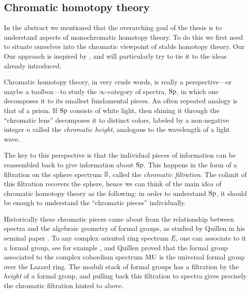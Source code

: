 

\subsection{Chromatic homotopy theory}
\label{ch0:ssec:chromatic-homotopy-theory}

In the abstract we mentioned that the overarching goal of the thesis is to understand aspects of monochromatic homotopy theory. To do this we first need to situate ourselves into the chromatic viewpoint of stable homotopy theory. Our Our approach is inspired by \cite{barthel-beaudry_19}, and will particularly try to tie it to the ideas already introduced. 

Chromatic homotopy theory, in very crude words, is really a perspective---or maybe a toolbox---to study the $\infty$-category of spectra, $\Sp$, in which one decomposes it to its smallest fundamental pieces. An often repeated analogy is that of a prism. If $\Sp$ consists of white light, then shining it through the ``chromatic lens'' decomposes it to distinct colors, labeled by a non-negative integer $n$ called the \emph{chromatic height}, analogous to the wavelength of a light wave. 

\begin{center}

\end{center}

The key to this perspective is that the individual pieces of information can be reassembled back to give information about $\Sp$. This happens in the form of a filtration on the sphere spectrum $\S$, called the \emph{chromatic filtration}. The colimit of this filtration recovers the sphere, hence we can think of the main idea of chromatic homotopy theory as the following: in order to understand $\Sp$, it should be enough to understand the ``chromatic pieces'' individually. 

\begin{remark}
    \label{ch0:rm:quillen-formal-groups}
    Historically these chromatic pieces came about from the relationship between spectra and the algebraic geometry of formal groups, as studied by Quillen in his seminal paper \cite{quillen_1969}. To any complex oriented ring spectrum $E$, one can associate to it a formal group, see for example \cite[Appendix 2]{ravenel_86}, and Quillen proved that the formal group associated to the complex cobordism spectrum $\MU$ is the universal formal group over the Lazard ring. The moduli stack of formal groups has a filtration by the \emph{height} of a formal group, and pulling back this filtration to spectra gives precisely the chromatic filtration hinted to above. 
\end{remark}

